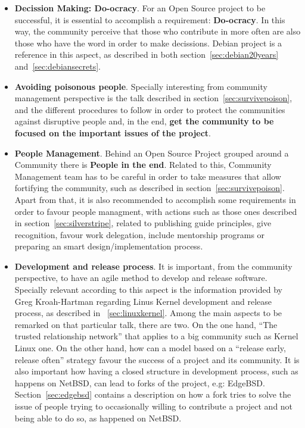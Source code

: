 \documentclass[11pt]{article}
\begin{document}
\begin{itemize}
\begin{itemize}
\item{\textbf{Decission Making: Do-ocracy}}. For an Open Source project to be successful, it is essential to accomplish a requirement: \textbf{Do-ocracy}. In this way, the community perceive that those who contribute in more often are also those who have the word in order to make decissions. Debian project is a reference in this aspect, as described in both section~\ref{sec:debian20years} and~\ref{sec:debiansecrets}. 
\item{\textbf{Avoiding poisonous people}}. Specially interesting from community management perspective is the talk described in section~\ref{sec:survivepoison}, and the different procedures to follow in order to protect the communities against disruptive people and, in the end, \textbf{get the community to be focused on the important issues of the project}.
\item{\textbf{People Management}}. Behind an Open Source Project grouped around a Community there is \textbf{People in the end}. Related to this, Community Management team has to be careful in order to take measures that allow fortifying the community, such as described in section~\ref{sec:survivepoison}. Apart from that, it is also recommended to accomplish some requirements in order to favour people managment, with actions such as those ones described in section~\ref{sec:silverstripe}, related to publishing guide principles, give recognition, favour work delegation, include mentorship programs or preparing an smart design/implementation process.
\item{\textbf{Development and release process}}. It is important, from the community perspective, to have an agile method to develop and release software. Specially relevant according to this aspect is the information provided by Greg Kroah-Hartman regarding Linus Kernel development and release process, as described in ~\ref{sec:linuxkernel}. Among the main aspects to be remarked on that particular talk, there are two. On the one hand, ``The trusted relationship network'' that applies to a big community such as Kernel Linux one. On the other hand, how can a model based on a ``release early, release often'' strategy favour the success of a project and its community. It is also important how having a closed structure in development process, such as happens on NetBSD, can lead to forks of the project, e.g: EdgeBSD. Section~\ref{sec:edgebsd} contains a description on how a fork tries to solve the issue of people trying to occasionally willing to contribute a project and not being able to do so, as happened on NetBSD.

\end{itemize}
\end{itemize}
\end{document}

